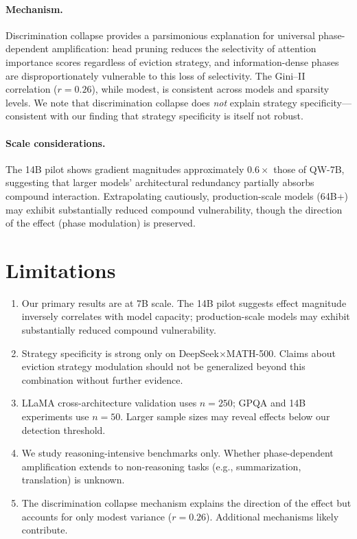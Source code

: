 \documentclass[11pt,a4paper]{article}
\begin{document}
\paragraph{Mechanism.}
Discrimination collapse provides a parsimonious explanation for universal phase-dependent amplification: head pruning reduces the selectivity of attention importance scores regardless of eviction strategy, and information-dense phases are disproportionately vulnerable to this loss of selectivity. The Gini--II correlation ($r = 0.26$), while modest, is consistent across models and sparsity levels. We note that discrimination collapse does \emph{not} explain strategy specificity---consistent with our finding that strategy specificity is itself not robust.

\paragraph{Scale considerations.}
The 14B pilot shows gradient magnitudes approximately $0.6\times$ those of QW-7B, suggesting that larger models' architectural redundancy partially absorbs compound interaction. Extrapolating cautiously, production-scale models (64B+) may exhibit substantially reduced compound vulnerability, though the direction of the effect (phase modulation) is preserved.

\section{Limitations}

\begin{enumerate}[nosep]
\item Our primary results are at 7B scale. The 14B pilot suggests effect magnitude inversely correlates with model capacity; production-scale models may exhibit substantially reduced compound vulnerability.
\item Strategy specificity is strong only on DeepSeek$\times$MATH-500. Claims about eviction strategy modulation should not be generalized beyond this combination without further evidence.
\item LLaMA cross-architecture validation uses $n=250$; GPQA and 14B experiments use $n=50$. Larger sample sizes may reveal effects below our detection threshold.
\item We study reasoning-intensive benchmarks only. Whether phase-dependent amplification extends to non-reasoning tasks (e.g., summarization, translation) is unknown.
\item The discrimination collapse mechanism explains the direction of the effect but accounts for only modest variance ($r = 0.26$). Additional mechanisms likely contribute.
\end{enumerate}
\end{document}
